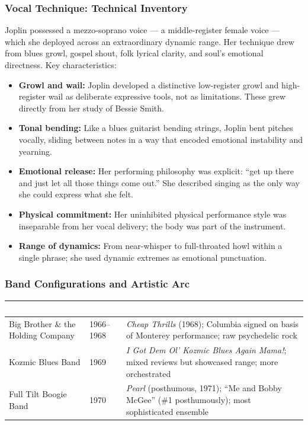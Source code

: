 \documentclass[11pt,letterpaper]{article}
\newcommand{\tableheader}[1]{\textbf{\sffamily\textcolor{white}{#1}}}
\begin{document}
\subsubsection{Vocal Technique: Technical Inventory}

Joplin possessed a mezzo-soprano voice --- a middle-register female voice --- which she deployed across an extraordinary dynamic range. Her technique drew from blues growl, gospel shout, folk lyrical clarity, and soul's emotional directness. Key characteristics:

\begin{itemize}[leftmargin=*]
  \item \textbf{Growl and wail:} Joplin developed a distinctive low-register growl and high-register wail as deliberate expressive tools, not as limitations. These grew directly from her study of Bessie Smith.
  \item \textbf{Tonal bending:} Like a blues guitarist bending strings, Joplin bent pitches vocally, sliding between notes in a way that encoded emotional instability and yearning.
  \item \textbf{Emotional release:} Her performing philosophy was explicit: ``get up there and just let all those things come out.'' She described singing as the only way she could express what she felt.
  \item \textbf{Physical commitment:} Her uninhibited physical performance style was inseparable from her vocal delivery; the body was part of the instrument.
  \item \textbf{Range of dynamics:} From near-whisper to full-throated howl within a single phrase; she used dynamic extremes as emotional punctuation.
\end{itemize}

\subsubsection{Band Configurations and Artistic Arc}

\begin{center}
\begin{tabularx}{\textwidth}{L{4cm}C{2cm}X}
\toprule
{}
\tableheader{Band / Period} & \tableheader{Years} & \tableheader{Key Recordings / Context} \\
\midrule
Big Brother \& the Holding Company & 1966--1968 & \textit{Cheap Thrills} (1968); Columbia signed on basis of Monterey performance; raw psychedelic rock \\
Kozmic Blues Band & 1969 & \textit{I Got Dem Ol' Kozmic Blues Again Mama!}; mixed reviews but showcased range; more orchestrated \\
Full Tilt Boogie Band & 1970 & \textit{Pearl} (posthumous, 1971); ``Me and Bobby McGee'' (\#1 posthumously); most sophisticated ensemble \\
\bottomrule
\end{tabularx}
\end{center}
\end{document}
